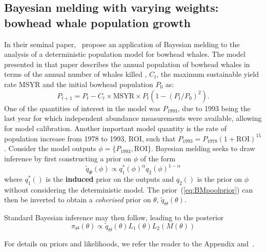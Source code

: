 \documentclass[a4paper, notitlepage, 10pt]{article}
\begin{document}

\subsection{Bayesian melding with varying weights: bowhead whale population growth}
\label{sec:bowhead}

In their seminal paper,~\cite{poole2000} propose an application of Bayesian melding to the analysis of a deterministic population model for bowhead whales.
The model presented in that paper describes the annual population of bowhead whales in terms of the annual number of whales killed , $C_t$, the maximum sustainable yield rate MSYR and the initial bowhead population $P_0$ as:
\begin{equation}
 P_{t + 1} = P_t - C_t \times \text{MSYR} \times P_t \left( 1- (P_t/P_0)^2 \right).
\end{equation}
One of the quantities of interest in the model was $P_{\text{1993}}$, due to 1993 being the last year for which independent abundance measurements were available, allowing for model calibration.
Another important model quantity is the rate of population increase from 1978 to 1993, ROI, such that $P_{1993} = P_{1978}(1 + \text{ROI})^{15}$.
Consider the model outputs $\phi = \{P_{1993}, \text{ROI}\}$.
Bayesian melding seeks to draw inference by first constructing a prior on $\phi$ of the form
\begin{equation}
 \label{eq:BMpoolprior}
 \tilde{q}_{\Phi}(\phi) \propto q_1^\ast(\phi)^\alpha q_2(\phi)^{1-\alpha}
\end{equation}
where $q_1^\ast()$ is the \textbf{induced} prior on the outputs and $q_2()$ is the prior on $\phi$ without considering the deterministic model.
The prior~(\ref{eq:BMpoolprior}) can then be inverted to obtain a \textit{coherised} prior on $\theta$, $\tilde{q}_{\Theta}(\theta)$. 

Standard Bayesian inference may then follow,  leading to the posterior
\begin{equation}
 \label{eq:BMpoolposterior}
 \pi_{\Theta}(\theta) \propto \tilde{q}_{\Theta}(\theta) L_1(\theta) L_2(M(\theta))
\end{equation}

For details on priors and likelihoods, we refer the reader to the Appendix and~\cite{poole2000}.
\end{document}
